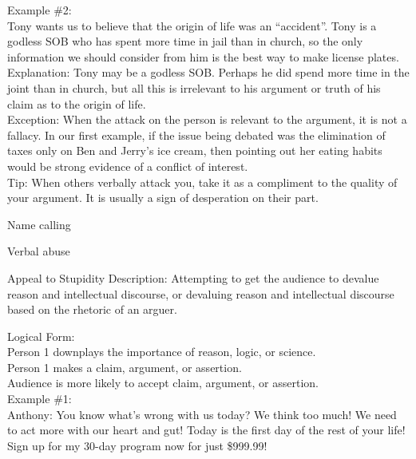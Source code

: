 \documentclass[a4paper,12pt,single,pdftex]{scrartcl}
\begin{document}
{    
      Example \#2:
    \\

    
      Tony wants us to believe that the origin of life was an “accident”.  Tony is a godless SOB who has spent more time in jail than in church, so the only information we should consider from him is the best way to make license plates.
    \\

    
      Explanation: Tony may be a godless SOB.  Perhaps he did spend more time in the joint than in church, but all this is irrelevant to his argument or truth of his claim as to the origin of life.
    \\

    
      Exception: When the attack on the person is relevant to the argument, it is not a fallacy.  In our first example, if the issue being debated was the elimination of taxes only on Ben and Jerry’s ice cream, then pointing out her eating habits would be strong evidence of a conflict of interest.
    \\

    
      Tip: When others verbally attack you, take it as a compliment to the quality of your argument.  It is usually a sign of desperation on their part.
    \\

  }


Name calling

Verbal abuse

Appeal to Stupidity
    Description: Attempting to get the audience to devalue reason and intellectual discourse, or devaluing reason and intellectual discourse based on the rhetoric of an arguer.

    
      Logical Form:
    \\

    
      Person 1 downplays the importance of reason, logic, or science.
    \\

    
      Person 1 makes a claim, argument, or assertion.
    \\

    
      Audience is more likely to accept claim, argument, or assertion.
    \\

    
      Example \#1:
    \\

    
      Anthony: You know what's wrong with us today? We think too much! We need to act more with our heart and gut! Today is the first day of the rest of your life! Sign up for my 30-day program now for just \$999.99!
    \\
\end{document}
